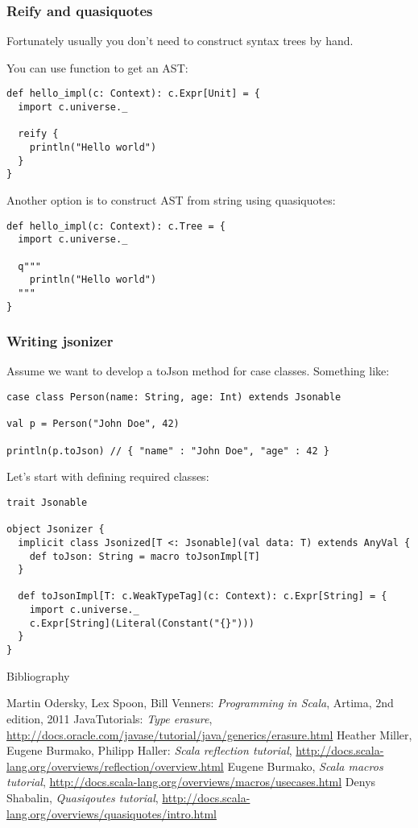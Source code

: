 \begin{frame}[fragile]
\frametitle{Reify and quasiquotes}
Fortunately usually you don't need to construct syntax trees by hand.

You can use function  to get an AST:
\begin{lstlisting}
def hello_impl(c: Context): c.Expr[Unit] = {
  import c.universe._

  reify {
    println("Hello world")
  }
}
\end{lstlisting}

Another option is to construct AST from string using quasiquotes:
\begin{lstlisting}
def hello_impl(c: Context): c.Tree = {
  import c.universe._

  q"""
    println("Hello world")
  """
}
\end{lstlisting}
\end{frame}

\begin{frame}[fragile]
\frametitle{Writing jsonizer}
Assume we want to develop a toJson method for case classes. Something like:
\begin{lstlisting}
case class Person(name: String, age: Int) extends Jsonable

val p = Person("John Doe", 42)

println(p.toJson) // { "name" : "John Doe", "age" : 42 }
\end{lstlisting}

Let's start with defining required classes:
\begin{lstlisting}
trait Jsonable

object Jsonizer {
  implicit class Jsonized[T <: Jsonable](val data: T) extends AnyVal {
    def toJson: String = macro toJsonImpl[T]
  }

  def toJsonImpl[T: c.WeakTypeTag](c: Context): c.Expr[String] = {
    import c.universe._
    c.Expr[String](Literal(Constant("{}")))
  }
}
\end{lstlisting}

\end{frame}

\begin{frame}{Bibliography}
\begin{thebibliography}{00}
Martin Odersky, Lex Spoon, Bill Venners:
\emph{Programming in Scala},
Artima, 2nd edition, 2011
Java\texttrademark  Tutorials: \emph{Type erasure}, \url{http://docs.oracle.com/javase/tutorial/java/generics/erasure.html}
Heather Miller, Eugene Burmako, Philipp Haller: \emph{Scala reflection tutorial}, \url{http://docs.scala-lang.org/overviews/reflection/overview.html}
Eugene Burmako, \emph{Scala macros tutorial}, \url{http://docs.scala-lang.org/overviews/macros/usecases.html}
Denys Shabalin, \emph{Quasiqoutes tutorial}, \url{http://docs.scala-lang.org/overviews/quasiquotes/intro.html}
\end{thebibliography}
\end{frame}




